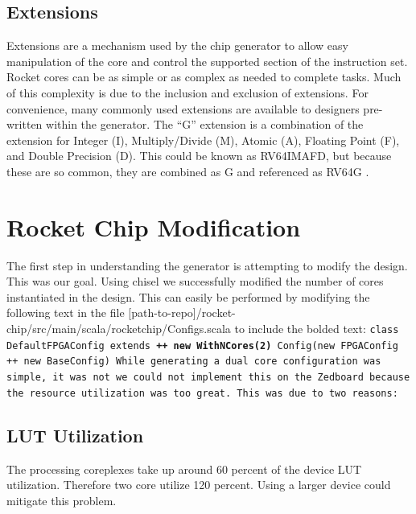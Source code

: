 \documentclass[journal]{IEEEtran}
\begin{document}
\subsection{Extensions}
Extensions are a mechanism used by the chip generator to allow easy manipulation of the core and control the supported section of the instruction set. Rocket cores can be as simple or as complex as needed to complete tasks. Much of this complexity is due to the inclusion and exclusion of extensions. For convenience, many commonly used extensions are available to designers pre-written within the generator. The ``G'' extension is a combination of the extension for Integer (I), Multiply/Divide (M), Atomic (A), Floating Point (F), and Double Precision (D). This could be known as RV64IMAFD, but because these are so common, they are combined as G and referenced as RV64G \cite{Waterman:EECS-2016-118}. 

\section{Rocket Chip Modification}
The first step in understanding the generator is attempting to modify the design. This was our goal. Using chisel we successfully modified the number of cores instantiated in the design. This can easily be performed by modifying the following text in the file [path-to-repo]/rocket-chip/src/main/scala/rocketchip/Configs.scala to include the bolded text:
\newline
\newline
\tt{class DefaultFPGAConfig extends \textbf{++ new WithNCores(2)} Config(new FPGAConfig ++ new BaseConfig)}\rm{}
\newline
\newline
While generating a dual core configuration was simple, it was not we could not implement this on the Zedboard because the resource utilization was too great. This was due to two reasons:
\subsection{LUT Utilization}
The processing coreplexes take up around 60 percent of the device LUT utilization. Therefore two core utilize 120 percent. Using a larger device could mitigate this problem.
\end{document}
